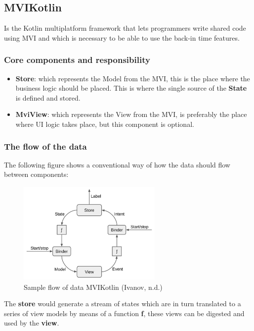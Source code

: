 \subsection{MVIKotlin}

Is the Kotlin multiplatform framework that lets programmers write shared code using MVI and which is necessary to be able to use the back-in time features.

\subsubsection{Core components and responsibility}

\begin{itemize}
    \item \textbf{Store}: which represents the Model from the MVI, this is the place where the business logic should be placed. This is where the single source of the \textbf{State} is defined and stored.
   	\item \textbf{MviView}: which represents the View from the MVI, is preferably the place where UI logic takes place, but this component is optional.
\end{itemize}

\subsubsection{The flow of the data}

The following figure shows a conventional way of how the data should flow between components:

\begin{figure}[h]
\centering
\includegraphics[height=5cm,width=7cm]{figures/flowdata}
\caption{Sample flow of data MVIKotlin (Ivanov, n.d.)}
\label{fig: Sample flow of data MVIKotlin}
\end{figure}

The \textbf{store} would generate a stream of states which are in turn translated to a series of view models by means of a function \textbf{f}, these views can be digested and used by the \textbf{view}. 

